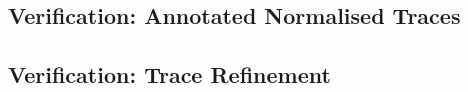     \subsection{Verification: Annotated Normalised Traces} 
            \label{sec:clock-normal-trace}     
    \subsection{Verification: Trace Refinement} 
            \label{sec:clock-encode}    




 
